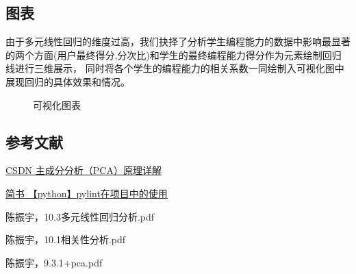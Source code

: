 \documentclass[UTF8]{ctexart}
\begin{document}
\subsection{图表}

由于多元线性回归的维度过高，我们抉择了分析学生编程能力的数据中影响最显著的两个方面(用户最终得分,分次比)和学生的最终编程能力得分作为元素绘制回归线进行三维展示，
同时将各个学生的编程能力的相关系数一同绘制入可视化图中展现回归的具体效果和情况。

\begin{figure}[htb] 
\caption{\label{2} 可视化图表} 
\end{figure}

\subsection{参考文献}
\href{https://blog.csdn.net/zhongkelee/article/details/44064401}{CSDN  主成分分析（PCA）原理详解}

\href{https://www.jianshu.com/p/c0bd637f706d}{简书 【python】pylint在项目中的使用}

陈振宇，10.3多元线性回归分析.pdf

陈振宇，10.1相关性分析.pdf

陈振宇，9.3.1+pca.pdf
\end{document}
